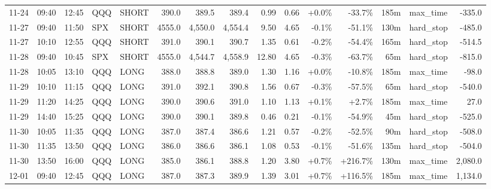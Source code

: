 \documentclass[11pt,a4paper,twoside]{article}
\begin{document}
\begin{landscape}
\begin{center}
\begin{longtable}{>{\color{txtmain}}l l l l l r r r r r r r r >{\color{txtmain}}l r}
11-24 & 09:40 & 12:45 & QQQ & SHORT & 390.0 & 389.5 & 389.4 & 0.99 & 0.66 & \textcolor{wingreen}{+0.0\%} & \textcolor{lossred}{-33.7\%} & 185m & max\_time & \textcolor{lossred}{-335.0} \\
11-27 & 09:40 & 11:50 & SPX & SHORT & 4555.0 & 4,550.0 & 4,554.4 & 9.50 & 4.65 & \textcolor{lossred}{-0.1\%} & \textcolor{lossred}{-51.1\%} & 130m & hard\_stop & \textcolor{lossred}{-485.0} \\
11-27 & 10:10 & 12:55 & QQQ & SHORT & 391.0 & 390.1 & 390.7 & 1.35 & 0.61 & \textcolor{lossred}{-0.2\%} & \textcolor{lossred}{-54.4\%} & 165m & hard\_stop & \textcolor{lossred}{-514.5} \\
11-28 & 09:40 & 10:45 & SPX & SHORT & 4555.0 & 4,544.7 & 4,558.9 & 12.80 & 4.65 & \textcolor{lossred}{-0.3\%} & \textcolor{lossred}{-63.7\%} & 65m & hard\_stop & \textcolor{lossred}{-815.0} \\
11-28 & 10:05 & 13:10 & QQQ & LONG & 388.0 & 388.8 & 389.0 & 1.30 & 1.16 & \textcolor{wingreen}{+0.0\%} & \textcolor{lossred}{-10.8\%} & 185m & max\_time & \textcolor{lossred}{-98.0} \\
11-29 & 10:10 & 11:15 & QQQ & LONG & 391.0 & 392.1 & 390.8 & 1.56 & 0.67 & \textcolor{lossred}{-0.3\%} & \textcolor{lossred}{-57.5\%} & 65m & hard\_stop & \textcolor{lossred}{-540.0} \\
11-29 & 11:20 & 14:25 & QQQ & LONG & 390.0 & 390.6 & 391.0 & 1.10 & 1.13 & \textcolor{wingreen}{+0.1\%} & \textcolor{wingreen}{+2.7\%} & 185m & max\_time & \textcolor{wingreen}{27.0} \\
11-29 & 14:40 & 15:25 & QQQ & LONG & 390.0 & 390.1 & 389.8 & 0.46 & 0.21 & \textcolor{lossred}{-0.1\%} & \textcolor{lossred}{-54.9\%} & 45m & hard\_stop & \textcolor{lossred}{-525.0} \\
11-30 & 10:05 & 11:35 & QQQ & LONG & 387.0 & 387.4 & 386.6 & 1.21 & 0.57 & \textcolor{lossred}{-0.2\%} & \textcolor{lossred}{-52.5\%} & 90m & hard\_stop & \textcolor{lossred}{-508.0} \\
11-30 & 11:35 & 13:50 & QQQ & LONG & 386.0 & 386.6 & 386.1 & 1.08 & 0.53 & \textcolor{lossred}{-0.1\%} & \textcolor{lossred}{-51.6\%} & 135m & hard\_stop & \textcolor{lossred}{-504.0} \\
11-30 & 13:50 & 16:00 & QQQ & LONG & 385.0 & 386.1 & 388.8 & 1.20 & 3.80 & \textcolor{wingreen}{+0.7\%} & \textcolor{wingreen}{+216.7\%} & 130m & max\_time & \textcolor{wingreen}{2,080.0} \\
12-01 & 09:40 & 12:45 & QQQ & LONG & 387.0 & 387.3 & 389.9 & 1.39 & 3.01 & \textcolor{wingreen}{+0.7\%} & \textcolor{wingreen}{+116.5\%} & 185m & max\_time & \textcolor{wingreen}{1,134.0} \\

\end{longtable}
\end{center}
\end{landscape}
\end{document}
